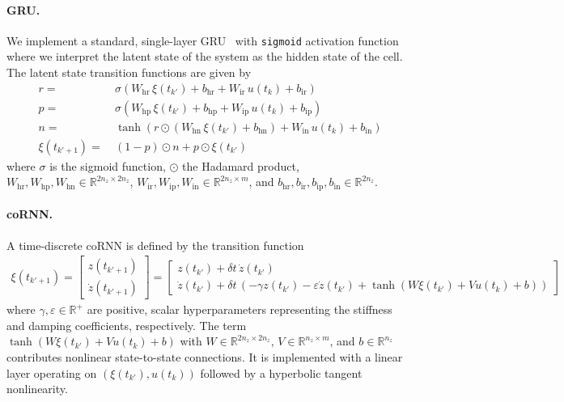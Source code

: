 \paragraph{GRU.}
We implement a standard, single-layer GRU~\citep{cho2014learning} with \texttt{sigmoid} activation function where we interpret the latent state of the system as the hidden state of the cell. The latent state transition functions are given by
\begin{equation}
\begin{split}
    r =& \: \sigma \left ( W_\mathrm{hr} \, \xi(t_{k'}) + b_\mathrm{hr} + W_\mathrm{ir} \, u(t_{k}) + b_\mathrm{ir} \right )\\
    p =& \: \sigma \left ( W_\mathrm{hp} \, \xi(t_{k'}) + b_\mathrm{hp} + W_\mathrm{ip} \, u(t_{k}) + b_\mathrm{ip} \right )\\
    n =& \: \tanh \left ( r \odot \left ( W_\mathrm{hn} \, \xi(t_{k'}) + b_\mathrm{hn} \right) + W_\mathrm{in} \, u(t_{k}) + b_\mathrm{in} \right )\\
    \xi(t_{k'+1}) =& \: (1-p) \odot n + p \odot \xi(t_{k'})
\end{split}
\end{equation}
where $\sigma$ is the sigmoid function, $\odot$ the Hadamard product, $W_\mathrm{hr}, W_\mathrm{hp}, W_\mathrm{hn} \in \mathbb{R}^{2 n_z \times 2 n_z}$, $W_\mathrm{ir}, W_\mathrm{ip}, W_\mathrm{in} \in \mathbb{R}^{2 n_z \times m}$, and $b_\mathrm{hr}, b_\mathrm{ir}, b_\mathrm{ip}, b_\mathrm{in} \in \mathbb{R}^{2 n_z}$.

\paragraph{coRNN.} A time-discrete \gls{coRNN} is defined by the transition function
\begin{equation}
\begin{split}
    \xi(t_{k'+1}) = \begin{bmatrix}
        z(t_{k'+1})\\
        \dot{z}(t_{k'+1})
    \end{bmatrix} = \begin{bmatrix}
        z(t_{k'}) + \delta t \, \dot{z}(t_{k'})\\
        \dot{z}(t_{k'}) + \delta t \, \left ( - \gamma z(t_{k'}) - \varepsilon \dot{z}(t_{k'}) + \tanh \left ( W \xi(t_{k'}) + V u(t_k) + b \right ) \right )
    \end{bmatrix}
\end{split}
\end{equation}
where $\gamma, \varepsilon \in \mathbb{R}^+$ are positive, scalar hyperparameters representing the stiffness and damping coefficients, respectively. The term $\tanh \left ( W \xi(t_{k'}) + V u(t_k) + b \right )$ with $W \in \mathbb{R}^{2n_z \times 2n_z}$, $V \in \mathbb{R}^{n_z \times m}$, and $b \in \mathbb{R}^{n_z}$ contributes nonlinear state-to-state connections. It is implemented with a linear layer operating on $(\xi(t_{k'}), u(t_k))$ followed by a hyperbolic tangent nonlinearity.

